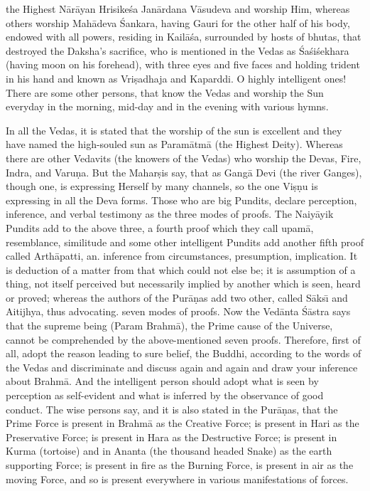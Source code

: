 the Highest N\=ar\=ayan Hrisike\'sa Jan\=ardana V\=asudeva and worship Him, whereas others worship Mah\=adeva \'Sankara, having Gauri for the other half of his body, endowed with all powers, residing in Kail\=a\'sa, surrounded by hosts of bhutas, that destroyed the Daksha's sacrifice, who is mentioned in the Vedas as \'Sa\'si\'sekhara (having moon on his forehead), with three eyes and five faces and holding trident in his hand and known as Vri\d{s}adhaja and Kaparddi. O highly intelligent ones! There are some other persons, that know the Vedas and worship the Sun everyday in the morning, mid-day and in the evening with various hymns.

In all the Vedas, it is stated that the worship of the sun is excellent and they have named the high-souled sun as Param\=atm\=a (the Highest Deity). Whereas there are other Vedavits (the knowers of the Vedas) who worship the Devas, Fire, Indra, and Varu\d{n}a. But the Mahar\d{s}is say, that as Gang\=a Devi (the river Ganges), though one, is expressing Herself by many channels, so the one Vi\d{s}\d{n}u is expressing in all the Deva forms. Those who are big Pundits, declare perception, inference, and verbal testimony as the three modes of proofs. The Naiy\=ayik Pundits add to the above three, a fourth proof which they call upam\=a, resemblance, similitude and some other intelligent Pundits add another fifth proof called Arth\=apatti, an. inference from circumstances, presumption, implication. It is deduction of a matter from that which could not else be; it is assumption of a thing, not itself perceived but necessarily implied by another which is seen, heard or proved; whereas the authors of the Pur\=a\d{n}as add two other, called S\=aks\={\i} and Aitijhya, thus advocating. seven modes of proofs. Now the Ved\=anta \'S\=astra says that the supreme being (Param Brahm\=a), the Prime cause of the Universe, cannot be comprehended by the above-mentioned seven proofs. Therefore, first of all, adopt the reason leading to sure belief, the Buddhi, according to the words of the Vedas and discriminate and discuss again and again and draw your inference about Brahm\=a. And the intelligent person should adopt what is seen by perception as self-evident and what is inferred by the observance of good conduct. The wise persons say, and it is also stated in the Pur\=a\d{n}as, that the Prime Force is present in Brahm\=a as the Creative Force; is present in Hari as the Preservative Force; is present in Hara as the Destructive Force; is present in Kurma (tortoise) and in Ananta (the thousand headed Snake) as the earth supporting Force; is present in fire as the Burning Force, is present in air as the moving Force, and so is present everywhere in various manifestations of forces.

